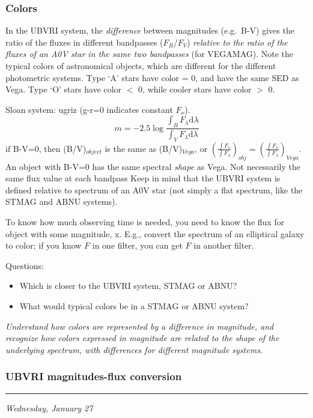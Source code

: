 \documentclass[12pt]{article}
\newcommand{\mydate}[1]{
    \begin{flushright}
        \rule{\textwidth}{0.4pt} %
        \footnotesize\hfill\textit{#1}
    \end{flushright}}
\begin{document}
\subsubsection{Colors}
In the UBVRI system, the \emph{difference} between magnitudes
(e.g.\ B-V) gives the ratio of the fluxes in different bandpasses
($F_{B}/F_{V}$)
\emph{relative to the ratio of the fluxes of
an A0V star in the same two bandpasses} (for VEGAMAG).
Note the typical colors of astronomical objects,
which are different for the different photometric systems.
Type `A' stars have color =  0, and have the same SED as Vega.
Type `O' stars have color $<$ 0,
while cooler stars have color $>$ 0.

Sloan system: ugriz (g-r=0 indicates constant $F_{\nu}$).
$$    m = -2.5\log\frac{\int_B F_{\lambda}\textrm{d}\lambda}
    {\int_V F_{\lambda}\textrm{d}\lambda} $$
if B-V=0, then (B/V)$_{object}$ is the same as (B/V)$_{Vega}$,
or $\left(\frac{\int F_{\nu}}{\int F_{\lambda}}\right)_{obj} =
    \left(\frac{\int F_{\nu}}{\int F_{\lambda}}\right)_{Vega} $.
An object with B-V=0 has the same spectral \emph{shape} as Vega.
Not necessarily the same flux value at each bandpass
Keep in mind that the UBVRI system is defined relative to spectrum of
an A0V star (not simply a flat spectrum, like the STMAG and ABNU
systems).

To know how much observing time is needed, you need to know the flux
for object with some magnitude, x.
E.g., convert the spectrum of an elliptical galaxy to color;
if you know $F$ in one filter, you can get $F$ in another filter.

Questions:
\begin{itemize}
    \item Which is closer to the UBVRI system, STMAG or ABNU?
    \item What would typical colors be in a STMAG or ABNU system?
\end{itemize}

\textcolor{om}{\emph{Understand how colors are represented by a difference in
magnitude, and recognize how colors expressed in magnitude are related
to the shape of the underlying spectrum, with differences for
different magnitude systems.}}

\subsubsection{UBVRI magnitudes-flux conversion}
\mydate{Wednesday, January 27}
\end{document}
